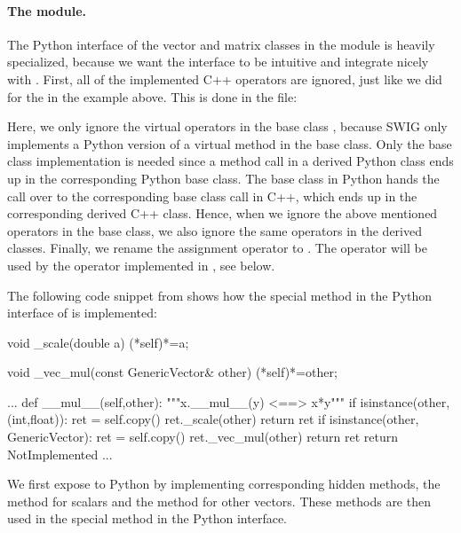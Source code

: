 \paragraph{The  module.}
The Python interface of the vector and matrix classes in the 
module is heavily specialized, because we want the interface to be
intuitive and integrate nicely with \numpy.  First, all of the implemented
C++ operators are ignored, just like we did for the  in
the  example above. This is done in the  file:
\begin{swigcode}

\end{swigcode}
Here, we only ignore the virtual operators in the base class
, because SWIG only implements a Python version of a
virtual method in the base class.  Only the base class implementation
is needed since a method call in a derived Python class ends up in
the corresponding Python base class. The base class in Python hands
the call over to the corresponding base class call in C++, which ends
up in the corresponding derived C++ class.  Hence, when we ignore the
above mentioned operators in the base class, we also ignore the same
operators in the derived classes.  Finally, we rename the assignment
operator to . The  operator will be used by
the  operator implemented in , see below.

The following code snippet from  shows how the special
method  in the Python interface of 
is implemented:
\begin{swigcode}
  void _scale(double a)
  {(*self)*=a;}

  void _vec_mul(const GenericVector& other)
  {(*self)*=other;}

   ...
    def __mul__(self,other):
        """x.__mul__(y) <==> x*y"""
        if isinstance(other,(int,float)):
            ret = self.copy()
            ret._scale(other)
            return ret
        if isinstance(other, GenericVector):
            ret = self.copy()
            ret._vec_mul(other)
            return ret
        return NotImplemented
    ...
\end{swigcode}
We first expose  to Python by implementing
corresponding hidden methods, the  method for scalars and
the  method for other vectors. These methods are then
used in the  special method in the Python interface.

